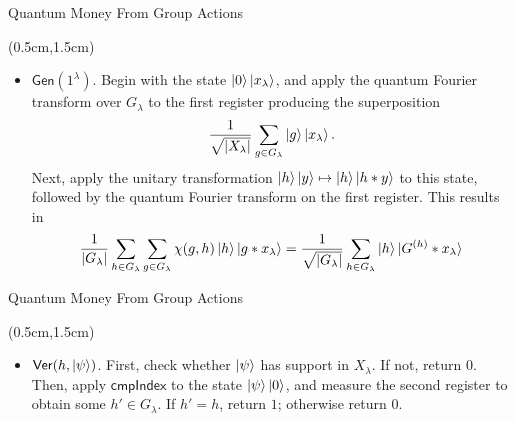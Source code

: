 \documentclass{beamer}
\theoremstyle{definition}
\newcommand{\comph}{\mathsf{cmpIndex}}
\newcommand{\gen}{\mathsf{Gen}}
\newcommand{\ver}{\mathsf{Ver}}
\begin{document}
\begin{frame}{Quantum Money From Group Actions}
    
    \begin{textblock*}{12cm}(0.5cm,1.5cm)
            
        
        \begin{itemize}
        \item $\gen(1^\lambda)$. Begin with the state $\ket{0}\ket{x_\lambda}$, and apply the quantum Fourier transform over $G_\lambda$ to the first register producing the superposition
        \[ \frac{1}{\sqrt{{|X_\lambda|}}} \sum_{g \in G_\lambda} \ket{g}\ket{x_\lambda}. \]
        Next, apply the unitary transformation $\ket{h}\ket{y} \mapsto \ket{h}\ket{h * y}$ to this state, followed by the quantum Fourier transform on the first register. This results in
        \[ \frac{1}{{|G_\lambda|}} \sum_{h \in G_\lambda} \sum_{g \in G_\lambda} \chi(g, h) \ket{h}\ket{g * x_\lambda} = \frac{1}{\sqrt{{|G_\lambda|}}} \sum_{h \in G_\lambda} \ket{h} \ket{G^{(h)} * x_\lambda} \]

        \end{itemize}

        
    \end{textblock*}


\end{frame}




\begin{frame}{Quantum Money From Group Actions}
    
    \begin{textblock*}{12cm}(0.5cm,1.5cm)
            
        
        \begin{itemize}
        \item $\ver(h, \ket{\psi})$. First, check whether $\ket{\psi}$ has support in $X_\lambda$. If not, return $0$. Then, apply $\comph$ to the state $\ket{\psi}\ket{0}$, and measure the second register to obtain some $h' \in G_\lambda$. If $h' = h$, return $1$; otherwise return $0$.
        \end{itemize}

        
    \end{textblock*}


\end{frame}
\end{document}

